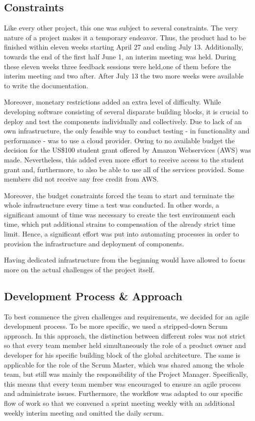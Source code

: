 \subsection{Constraints}\label{constraints}

Like every other project, this one was subject to several constraints.
The very nature of a project makes it a temporary endeavor. Thus, the
product had to be finished within eleven weeks starting April 27 and
ending July 13. Additionally, towards the end of the first half June 1,
an interim meeting was held. During these eleven weeks three feedback
sessions were held,one of them before the interim meeting and two after.
After July 13 the two more weeks were available to write the
documentation.

Moreover, monetary restrictions added an extra level of difficulty.
While developing software consisting of several disparate building
blocks, it is crucial to deploy and test the components individually and
collectively. Due to lack of an own infrastructure, the only feasible
way to conduct testing - in functionality and performance - was to use a
cloud provider. Owing to no available budget the decision for the US\$100
student grant offered by Amazon Webservices (AWS) was made.
Nevertheless, this added even more effort to receive access to the
student grant and, furthermore, to also be able to use all of the
services provided. Some members did not receive any free credit from
AWS.

Moreover, the budget constraints forced the team to start and terminate
the whole infrastructure every time a test was conducted. In other
words, a significant amount of time was necessary to create the test
environment each time, which put additional strains to compensation of
the already strict time limit. Hence, a significant effort was put into
automating processes in order to provision the infrastructure and
deployment of components.

Having dedicated infrastructure from the beginning would have allowed to
focus more on the actual challenges of the project itself.

\subsection{Development Process \&
Approach}\label{development-process-approach}

To best commence the given challenges and requirements, we decided for
an agile development process. To be more specific, we used a
stripped-down Scrum approach. In this approach, the distinction between
different roles was not strict so that every team member held
simultaneously the role of a product owner and developer for his
specific building block of the global architecture. The same is
applicable for the role of the Scrum Master, which was shared among the
whole team, but still was mainly the responsibility of the Project
Manager. Specifically, this means that every team member was encouraged
to ensure an agile process and administrate issues. Furthermore, the
workflow was adapted to our specific flow of work so that we convened a
sprint meeting weekly with an additional weekly interim meeting and
omitted the daily scrum.

